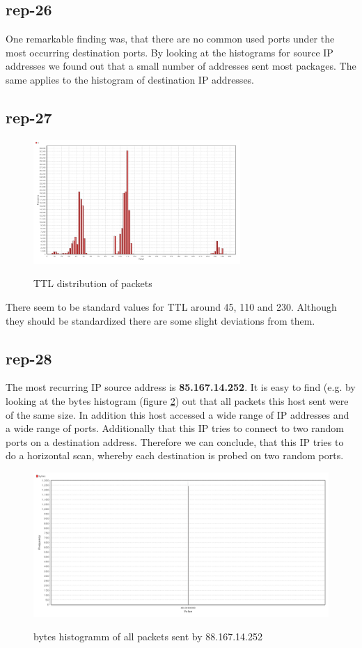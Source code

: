 \subsection*{rep-26}
One remarkable finding was, that there are no common used ports under the most occurring destination ports.
By looking at the histograms for source IP addresses we found out that a small number of addresses sent most packages. The same applies to the histogram of destination IP addresses.

\subsection*{rep-27}

\begin{figure}[H]
\center
\includegraphics[width=0.7\textwidth]{./chapters/plots/rep-27-ttl}\\
\caption{TTL distribution of packets}
\label{fig:ttl-distribution}
\end{figure}

There seem to be standard values for TTL around 45, 110 and 230. Although they should be standardized there are some slight deviations from them.

\subsection*{rep-28}
The most recurring IP source address is \textbf{85.167.14.252}.
It is easy to find (e.g. by looking at the bytes histogram (figure \ref{fig:bytes-histo}) out that all packets this host sent were of the same size. In addition this host accessed a wide range of IP addresses and a wide range of ports. Additionally that this IP tries to connect to two random ports on a destination address. Therefore we can conclude, that this IP tries to do a horizontal scan, whereby each destination is probed on two random ports.

\begin{figure}[H]
\center
\includegraphics[width=.7\textwidth]{./chapters/plots/rep-28-bytes-histo}\\
\caption{bytes histogramm of all packets sent by 88.167.14.252}
\label{fig:bytes-histo}
\end{figure}

